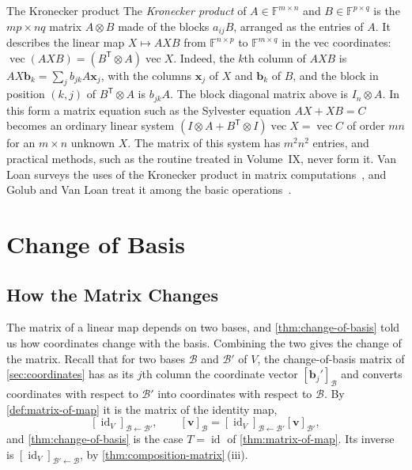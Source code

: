 \begin{note}{The Kronecker product}
The \emph{Kronecker product} of $A\in\mathbb F^{m\times n}$ and $B\in\mathbb F^{p\times q}$ is the $mp\times nq$ matrix $A\otimes B$ made of the blocks $a_{ij}B$, arranged as the entries of $A$. It describes the linear map $X\mapsto AXB$ from $\mathbb F^{n\times p}$ to $\mathbb F^{m\times q}$ in the vec coordinates: $\operatorname{vec}(AXB)=(B^{\mathsf T}\otimes A)\operatorname{vec}X$. Indeed, the $k$th column of $AXB$ is $AX\mathbf b_k=\sum_jb_{jk}A\mathbf x_j$, with the columns $\mathbf x_j$ of $X$ and $\mathbf b_k$ of $B$, and the block in position $(k,j)$ of $B^{\mathsf T}\otimes A$ is $b_{jk}A$. The block diagonal matrix above is $I_n\otimes A$. In this form a matrix equation such as the Sylvester equation $AX+XB=C$ becomes an ordinary linear system $(I\otimes A+B^{\mathsf T}\otimes I)\operatorname{vec}X=\operatorname{vec}C$ of order $mn$ for an $m\times n$ unknown $X$. The matrix of this system has $m^2n^2$ entries, and practical methods, such as the routine  treated in Volume~IX, never form it. Van Loan surveys the uses of the Kronecker product in matrix computations~\cite{vanloan2000}, and Golub and Van Loan treat it among the basic operations~\cite{golub2013}.
\end{note}

\section{Change of Basis}
\label{sec:change-of-basis-maps}

\subsection{How the Matrix Changes}

The matrix of a linear map depends on two bases, and \cref{thm:change-of-basis} told us how coordinates change with the basis. Combining the two gives the change of the matrix. Recall that for two bases $\mathcal B$ and $\mathcal B'$ of $V$, the change-of-basis matrix of \cref{sec:coordinates} has as its $j$th column the coordinate vector $[\mathbf b_j']_{\mathcal B}$ and converts coordinates with respect to $\mathcal B'$ into coordinates with respect to $\mathcal B$. By \cref{def:matrix-of-map} it is the matrix of the identity map,
\[
[\operatorname{id}_V]_{\mathcal B\leftarrow\mathcal B'},\qquad[\mathbf v]_{\mathcal B}=[\operatorname{id}_V]_{\mathcal B\leftarrow\mathcal B'}[\mathbf v]_{\mathcal B'},
\]
and \cref{thm:change-of-basis} is the case $T=\operatorname{id}$ of \cref{thm:matrix-of-map}. Its inverse is $[\operatorname{id}_V]_{\mathcal B'\leftarrow\mathcal B}$, by \cref{thm:composition-matrix}\,(iii).

